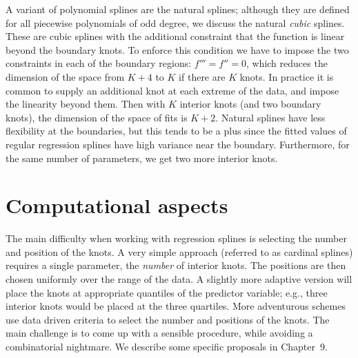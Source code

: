 %
%
%
%
A variant of polynomial splines are the natural splines; although they are defined for  all piecewise polynomials of odd degree, we  discuss the natural {\sl cubic} splines. 
These are cubic splines with the additional constraint that the function is linear beyond the boundary knots. 
To enforce this condition we have to impose the two constraints in each of the boundary  regions: $f'''=f''=0$, which reduces the dimension of the space from $K+4$ to $K$ if there are $K$ knots. 
%
%
In practice it is common to supply an additional knot at each extreme of the data, and impose the linearity beyond them. 
%
%
Then with $K$ interior knots (and two boundary knots), the dimension of the space of fits is $K+2$. 
Natural splines have less flexibility at the boundaries, but this tends to be a plus since the fitted values of regular regression splines have high variance near the boundary.
%
%
Furthermore, for the same number of parameters, we get two more interior knots.  

\sectionskip
\section{Computational aspects} 
The main difficulty when working with regression  splines is 
%
%
 selecting the number and position of the knots. 
A very simple approach (referred to as cardinal splines) requires a single parameter, the {\sl number} of interior knots. 
The positions are then chosen uniformly over the range of the data. 
%
A slightly more adaptive version will place the knots at appropriate quantiles of the predictor variable; e.g., three interior knots would be placed at the three quartiles.
More adventurous schemes use data driven criteria to select the number and positions of the knots. 
The main challenge is to come up with a sensible procedure, while avoiding a combinatorial nightmare. 
We describe some specific proposals in Chapter~9.

%
 

